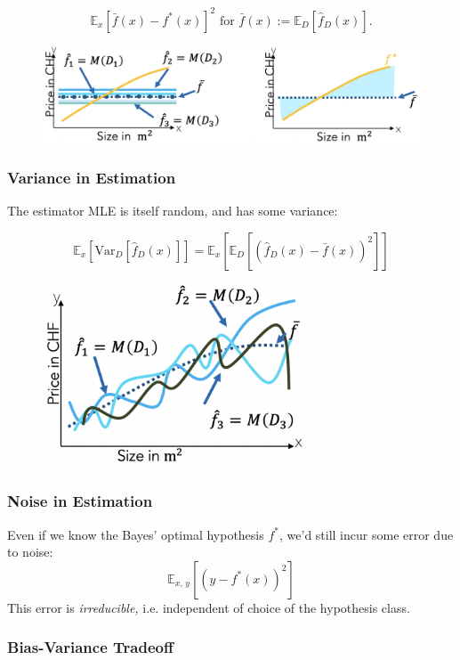 \documentclass[a4paper]{extarticle}
\begin{document}
\[
    \mathbb{E}_x[\bar{f}(x) - f^*(x)]^2 \text{ for } \bar{f}(x) := \mathbb{E}_D[\hat{f}_D(x)].
\]

\begin{figure}[H]
    \includegraphics[width=15cm]{../images/IntroML_Fig10-2}
    \centering
\end{figure}

\subsubsection{Variance in Estimation}

The estimator MLE is itself random, and has some variance:

\[
    \mathbb{E}_x[\text{Var}_D[\hat{f}_D(x)]] = \mathbb{E}_x[\mathbb{E}_D[(\hat{f}_D(x) - \bar{f}(x))^2]]
\]

\begin{figure}[H]
    \includegraphics[width=8cm]{../images/IntroML_Fig10-3}
    \centering
\end{figure}

\subsubsection{Noise in Estimation}

Even if we know the Bayes' optimal hypothesis $f^*$, we'd still incur some error due to noise:
\[
    \mathbb{E}_{x, \, y}[(y - f^*(x))^2]
\]
This error is \textit{irreducible,} i.e. independent of choice of the hypothesis class.

\subsubsection{Bias-Variance Tradeoff}
\end{document}
